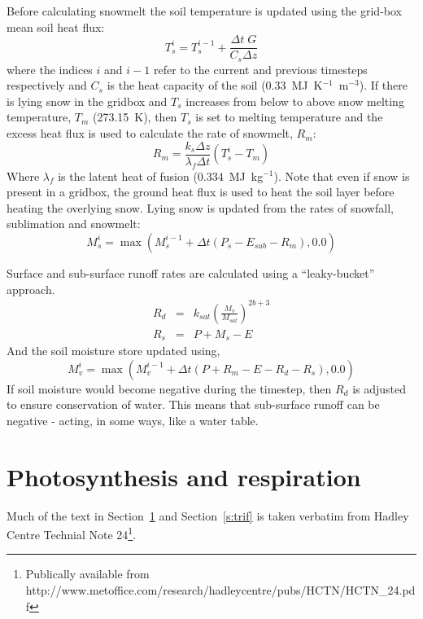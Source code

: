 \documentclass[a4paper]{article}
\begin{document}
Before calculating snowmelt the soil temperature is updated using the
grid-box mean soil heat flux:
\begin{equation}
  T_s^i = T_s^{i-1} + \frac{\Delta t \; G}{C_s \Delta z} \label{e:ts}
\end{equation}
where the indices $i$ and $i-1$ refer to the current and previous
timesteps respectively and $C_s$ is the heat capacity of the soil
(0.33~MJ~K$^{-1}$~m$^{-3}$).  If there is lying snow in the gridbox
and $T_s$ increases from below to above snow melting temperature,
$T_m$ (273.15~K), then $T_s$ is set to melting temperature and the
excess heat flux is used to calculate the rate of snowmelt, $R_m$:
\begin{equation}
  R_m = \frac{k_s \Delta z}{\lambda_{f} \Delta t} \left(T_s^i -
  T_m\right) \label{e:melt}
\end{equation}
Where $\lambda_f$ is the latent heat of fusion (0.334~MJ~kg$^{-1}$).
Note that even if snow is present in a gridbox, the ground heat flux
is used to heat the soil layer before heating the overlying snow.
Lying snow is updated from the rates of snowfall, sublimation and
snowmelt:
\begin{equation}
  M_s^i = \max(M_s^{i-1} + \Delta t (P_s - E_{sub} - R_m),0.0) \label{e:Dsnow}
\end{equation}

Surface and sub-surface runoff rates are calculated using a
``leaky-bucket'' approach.
\begin{eqnarray}
  R_d &=& k_{sat} \left(\frac{M_v}{M_{sat}}
  \right)^{2b+3} \label{e:drain} \\ 
  R_s &=& P + M_s - E \label{e:roff}
\end{eqnarray}
And the soil moisture store updated using,
\begin{equation}
  M_v^i = \max( M_v^{i-1} + \Delta t (P + R_m - E - R_d - R_s), 0.0)
\end{equation}
If soil moisture would become negative during the timestep, then $R_d$
is adjusted to ensure conservation of water.  This means that
sub-surface runoff can be negative - acting, in some ways, like a
water table.

\section{Photosynthesis and respiration}\label{s:photo}
Much of the text in Section~\ref{s:photo} and Section~\ref{s:trif} is
taken verbatim from Hadley Centre Technial Note 24\footnote{Publically
available from
http://www.metoffice.com/research/hadleycentre/pubs/HCTN/HCTN\_24.pdf}.
\end{document}
